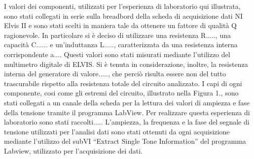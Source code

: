 I valori dei componenti, utilizzati per l’esperienza di laboratorio qui illustrata, sono stati collegati in serie sulla breadbord della scheda di acquisizione dati NI Elvis II e sono stati scelti in maniera tale da ottenere un fattore di qualità Q ragionevole.
In particolare si è deciso di utilizzare una resistenza R....., una capacità C......  e un’induttanza L....., caratterizzata da una resistenza interna corrispondente a.... Questi valori sono stati misurati mediante l’utilizzo del multimetro digitale di ELVIS.
Si è tenuta in considerazione, inoltre, la resistenza interna del generatore di valore....., che perciò risulta essere non del tutto trascurabile rispetto alla resistenza totale del circuito analizzato.
I capi di ogni componente, cosi come gli estremi del circuito, illustrato nella Figura 1., sono stati collegati a un canale della scheda per la lettura dei valori di ampiezza e fase della tensione tramite il programma LabView.
Per realizzare questa esperienza di laboratorio sono stati raccolti.....
L’ampiezza, la frequenza e la fase del segnale di tensione utilizzati per l’analisi dati sono stati ottenuti da ogni acquisizione mediante l’utilizzo del subVI “Extract Single Tone Information” del programma Labview, utilizzato per l’acquisizione dei dati.
